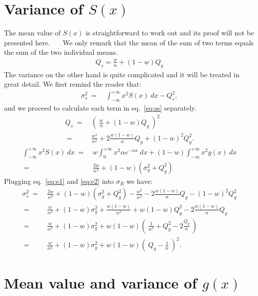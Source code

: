 \documentclass[a4paper,11pt]{article}
\begin{document}
\section{Variance of $S(x)$}
\label{appB}

The mean value of $S(x)$ is straightforward to work out and its proof will not be presented here. \ \ \ 
We only remark that the mean of the sum of two terms equals the sum of the two individual means. 
\begin{align}
Q_s =  \frac{w}{\alpha} + (1-w)Q_g 
\end{align}
The variance on the other hand is quite complicated and it will be treated in great detail. 
We first remind the reader that:
\begin{align}
\sigma^2_s \  =  \ & \int_{-\infty}^{+\infty} x^2 S(x) \ dx - Q_s^2, \label{eq:ss}
\end{align}
and we proceed to calculate each term in eq.~\eqref{eq:ss} separately. 
\begin{align}
Q_s \ = \ &  \left(\  \frac{w}{\alpha} + (1-w)Q_g  \ \right)^2 \nonumber \\
\ = \ & \frac{w^2}{\alpha^2} + 2 \frac{w(1-w)}{\alpha} Q_g + (1-w)^2 Q_g^2. \label{eq:e1}
\end{align}
\begin{align}
\int_{-\infty}^{+\infty} x^2 S(x) \ dx  \  =  \ & w   \int_{0}^{+\infty} x^2 \alpha e^{-\alpha x } \ dx + (1-w)\int_{-\infty}^{+\infty} x^2 g(x) \ dx  \nonumber \\
 \  =  \ & \frac{2w}{\alpha^2} + (1-w)( \sigma_g^2 + Q_g^2 ) \label{eq:e2}
\end{align}
Plugging eq.~\eqref{eq:e1} and \eqref{eq:e2} into $\sigma_R$ we have:
\begin{align}
\sigma^2_s \  =  \ & \frac{2w}{\alpha^2} + (1-w)( \sigma_g^2 + Q_g^2 )   -  \frac{w^2}{\alpha^2} - 2 \frac{w(1-w)}{\alpha} Q_g -  (1-w)^2 Q_g^2 \nonumber \\
                \  =  \ & \frac{w}{\alpha^2} + (1-w) \sigma_g^2  + \frac{w(1-w)}{\alpha^2} + w(1-w)Q_g^2 - 2 \frac{w(1-w)}{\alpha} Q_g \nonumber \\
                \  =  \ & \frac{w}{\alpha^2} + (1-w) \sigma_g^2  +  w(1-w)\left( \  \frac{1}{\alpha^2} +Q_g^2 - 2 \frac{Q_g}{\alpha} \  \right) \nonumber \\
                 \  =  \ & \frac{w}{\alpha^2} + (1-w) \sigma_g^2  + w(1-w)\left( \ Q_g - \frac{1}{\alpha}  \ \right)^2.
\end{align}

\section{Mean value and variance of $g(x)$}
\label{appC}
\end{document}
